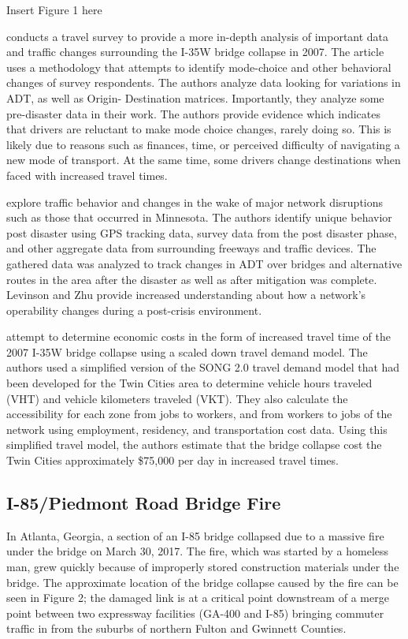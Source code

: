 Insert Figure 1 here

\cite{zhu2010} conducts a travel survey to provide a more in-depth
analysis of important data
and traffic changes surrounding the I-35W bridge collapse in 2007. The
article uses a methodology
that attempts to identify mode-choice and other behavioral changes of
survey respondents. The
authors analyze data looking for variations in ADT, as well as Origin-
Destination matrices.
Importantly, they analyze some pre-disaster data in their work. The
authors provide evidence
which indicates that drivers are reluctant to make mode choice changes,
rarely doing so. This is
likely due to reasons such as finances, time, or perceived difficulty of
navigating a new mode of
transport. At the same time, some drivers change destinations when faced
with increased travel
times.

\cite{levinson2010} explore traffic behavior and changes in the wake of
major network
disruptions such as those that occurred in Minnesota. The authors identify
unique behavior post
disaster using GPS tracking data, survey data from the post disaster
phase, and other aggregate
data from surrounding freeways and traffic devices. The gathered data was
analyzed to track
changes in ADT over bridges and alternative routes in the area after the
disaster as well as
after mitigation was complete. Levinson and Zhu provide increased
understanding about how a
network's operability changes during a post-crisis environment.

\cite{xie2011} attempt to determine economic costs in the form of
increased travel time
of the 2007 I-35W bridge collapse using a scaled down travel demand model.
The authors used a
simplified version of the SONG 2.0 travel demand model that had been
developed for the Twin
Cities area to determine vehicle hours traveled (VHT) and vehicle
kilometers traveled (VKT). They
also calculate the accessibility for each zone from jobs to workers, and
from workers to jobs of
the network using employment, residency, and transportation cost data.
Using this simplified
travel model, the authors estimate that the bridge collapse cost the Twin
Cities approximately
\$75,000 per day in increased travel times.

\subsection{I-85/Piedmont Road Bridge Fire}

In Atlanta, Georgia, a section of an I-85 bridge collapsed due to a
massive fire under the bridge
on March 30, 2017. The fire, which was started by a homeless man, grew
quickly because of
improperly stored construction materials under the bridge. The approximate
location of the bridge
collapse caused by the fire can be seen in Figure 2; the damaged link is
at a critical point
downstream of a merge point between two expressway facilities (GA-400 and
I-85) bringing commuter
traffic in from the suburbs of northern Fulton and Gwinnett Counties.

